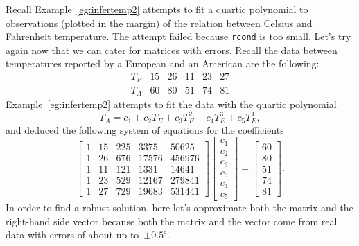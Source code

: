 \begin{example} \label{eg:}
Recall Example~\ref{eg:infertemp2} attempts to fit a quartic polynomial to observations (plotted in the margin) of the relation between Celsius and Fahrenheit temperature. 
The attempt failed because \verb|rcond| is too small.
Let's try again now that we can cater for matrices with errors.
Recall the data between temperatures reported by a European and an American are the following:
%
\begin{equation*}
\begin{array}{l|rrrrr}
T_E&15&26&11&23&27\\
T_A&60&80&51&74&81
\end{array}
\end{equation*}
Example~\ref{eg:infertemp2} attempts to fit the data with the quartic polynomial
\begin{equation*}
T_A=c_1+c_2T_E+c_3T_E^2+c_4T_E^3+c_5T_E^4,
\end{equation*}
and deduced the following system of equations for the coefficients
\begin{equation*}
\begin{bmatrix} 1&15&225&3375&50625
\\1&26&676&17576&456976
\\1&11&121&1331&14641
\\1&23&529&12167&279841
\\1&27&729&19683&531441 \end{bmatrix}
\begin{bmatrix} c_1\\c_2\\c_3\\c_3\\c_4\\c_5 \end{bmatrix}
=\begin{bmatrix} 60\\80\\51\\74\\81 \end{bmatrix}.
\end{equation*}
In order to find a robust solution, here let's approximate both the matrix and the right-hand side vector because both the matrix and the vector come from real data with errors of about up to~\(\pm0.5^\circ\).


\end{example}
